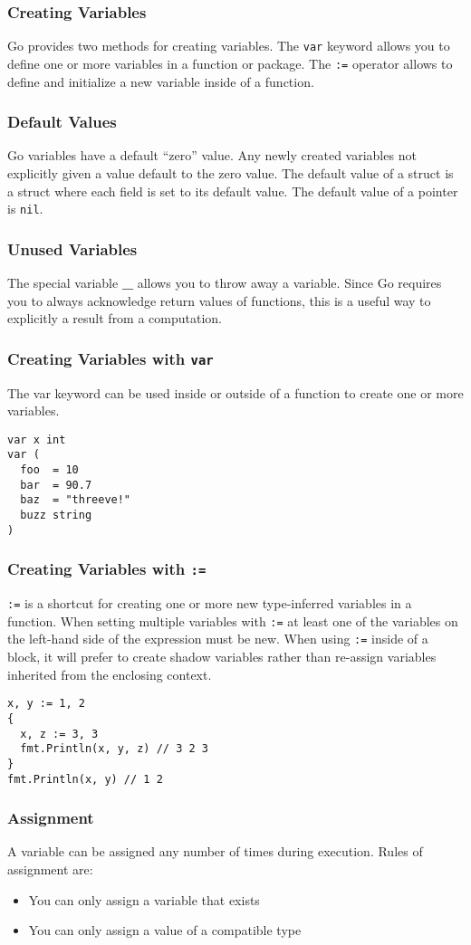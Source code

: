 \documentclass{beamer}
\begin{document}
\begin{frame}
  \frametitle{Creating Variables}
  Go provides two methods for creating variables.  The {\tt var}
  keyword allows you to define one or more variables in a function or
  package.  The {\tt :=} operator allows to define and initialize a
  new variable inside of a function.
\end{frame}

\begin{frame}
  \frametitle{Default Values}
  Go variables have a default ``zero'' value.  Any newly created
  variables not explicitly given a value default to the zero value.
  The default value of a struct is a struct where each field is set to
  its default value.  The default value of a pointer is {\tt nil}.
\end{frame}

\begin{frame}
  \frametitle{Unused Variables}
  The special variable {\bf \_} allows you to throw away a variable.
  Since Go requires you to always acknowledge return values of
  functions, this is a useful way to explicitly a result from a
  computation.
\end{frame}

\begin{frame}[fragile]
  \frametitle{Creating Variables with {\tt var}}
  The var keyword can be used inside or outside of a function to
  create one or more variables.
\begin{lstlisting}[language=Golang]
var x int
var (
  foo  = 10
  bar  = 90.7
  baz  = "threeve!"
  buzz string
)
\end{lstlisting}
\end{frame}

\begin{frame}[fragile]
  \frametitle{Creating Variables with {\tt :=}}
  {\tt:=} is a shortcut for creating one or more new type-inferred
  variables in a function.  When setting multiple variables with
  {\tt:=} at least one of the variables on the left-hand side of the
  expression must be new.  When using {\tt :=} inside of a block, it
  will prefer to create shadow variables rather than re-assign
  variables inherited from the enclosing context.
\begin{lstlisting}[language=Golang]
x, y := 1, 2
{
  x, z := 3, 3
  fmt.Println(x, y, z) // 3 2 3
}
fmt.Println(x, y) // 1 2
\end{lstlisting}
\end{frame}

\begin{frame}
  \frametitle{Assignment}
  A variable can be assigned any number of times during execution.
  Rules of assignment are:
  \begin{itemize}
  \item You can only assign a variable that exists
  \item You can only assign a value of a compatible type
  \end{itemize}
\end{frame}
\end{document}
